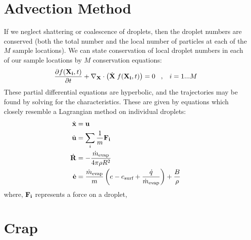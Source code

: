 \documentclass{article}
\begin{document}
\section{Advection Method}
If we neglect shattering or coalescence of droplets, then the droplet numbers are conserved (both the total number 
and the local number of particles at each of the $M$ sample locations). We can state conservation of local 
droplet numbers in each of our sample locations by $M$ conservation equations:
\begin{equation}
\frac{\partial f({\bf X_i},t)}{\partial t} + \nabla_{\bf X} \cdot \left(\dot {\bf X} \; f({\bf X_i},t) \right) = 0 \; \; \; , \;\;\; i=1...M
\end{equation}
These partial differential equations are hyperbolic, and the trajectories may be found by solving for the characteristics. 
These are given by equations which closely resemble a Lagrangian method on individual droplets:
\begin{equation}
\begin{aligned}
\dot{\bf x} & = {\bf u}  \\
\dot{\bf u} & = \sum_i \frac{1}{m} {\bf F_i} \\
\dot{\bf R} & = -\frac{\dot{m}_{\text{evap}}}{4 \pi \rho R^2} \\
\dot{\bf e} & = \frac{\dot{m}_{\text{evap}}}{m} \left( e - e_{\text{surf}} + \frac{\dot{q}}{\dot{m}_{\text{evap}}}\right) + \frac{B}{\rho}
\end{aligned}
\end{equation}
where, $\bf{F_i}$ represents a force on a droplet, 










\newpage
\section{Crap}
\end{document}
